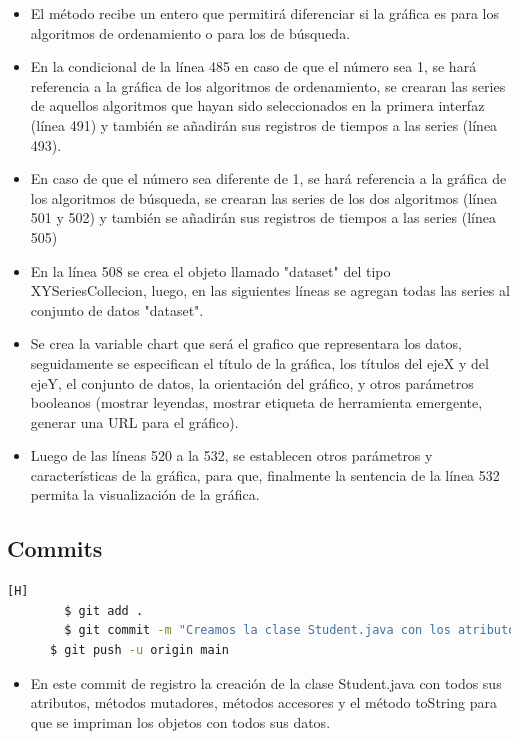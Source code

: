 \documentclass{article}
\begin{document}
    \begin{itemize}
        \item El método recibe un entero que permitirá diferenciar si la gráfica es para los algoritmos de ordenamiento o para los de búsqueda.
        \item En la condicional de la línea 485 en caso de que el número sea 1, se hará referencia a la gráfica de los algoritmos de ordenamiento, se crearan las series de aquellos algoritmos que hayan sido seleccionados en la primera interfaz (línea 491) y también se añadirán sus registros de tiempos a las series (línea 493).
        \item En caso de que el número sea diferente de 1, se hará referencia a la gráfica de los algoritmos de búsqueda, se crearan las series de los dos algoritmos (línea 501 y 502) y también se añadirán sus registros de tiempos a las series (línea 505)
        \item En la línea 508 se crea el objeto llamado "dataset" del tipo XYSeriesCollecion, luego, en las siguientes líneas se agregan todas las series al conjunto de datos "dataset".
        \item Se crea la variable chart que será el grafico que representara los datos, seguidamente se especifican el título de la gráfica, los títulos del ejeX y del ejeY, el conjunto de datos, la orientación del gráfico, y otros parámetros booleanos (mostrar leyendas, mostrar etiqueta de herramienta emergente, generar una URL para el gráfico).
        \item Luego de las líneas 520 a la 532, se establecen otros parámetros y características de la gráfica, para que, finalmente la sentencia de la línea 532 permita la visualización de la gráfica.
	\end{itemize}

    \subsection{Commits}

    \begin{lstlisting}[language=bash,caption={Comit n°1}][H]		
		$ git add .
		$ git commit -m "Creamos la clase Student.java con los atributos necesarios, además del archivo StudentRegistration.java. Por el  momento lee los archivos .csv y los imprime (utilizando arreglos estándar)"
      $ git push -u origin main
	\end{lstlisting}

    \begin{itemize}
        \item En este commit de registro la creación de la clase Student.java con todos sus atributos, métodos mutadores, métodos accesores y el método toString para que se impriman los objetos con todos sus datos.
    \end{itemize}
    
\end{document}
